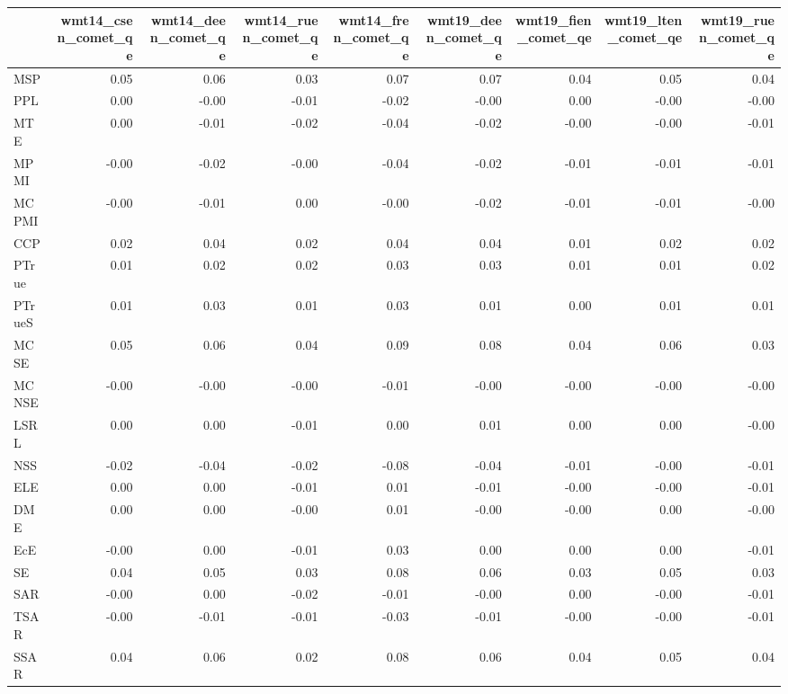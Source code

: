 \begin{tabular}{lrrrrrrrr}
\toprule
 & wmt14\_csen\_comet\_qe & wmt14\_deen\_comet\_qe & wmt14\_ruen\_comet\_qe & wmt14\_fren\_comet\_qe & wmt19\_deen\_comet\_qe & wmt19\_fien\_comet\_qe & wmt19\_lten\_comet\_qe & wmt19\_ruen\_comet\_qe \\
\midrule
MSP & 0.05 & 0.06 & 0.03 & 0.07 & 0.07 & 0.04 & 0.05 & 0.04 \\
PPL & 0.00 & -0.00 & -0.01 & -0.02 & -0.00 & 0.00 & -0.00 & -0.00 \\
MTE & 0.00 & -0.01 & -0.02 & -0.04 & -0.02 & -0.00 & -0.00 & -0.01 \\
MPMI & -0.00 & -0.02 & -0.00 & -0.04 & -0.02 & -0.01 & -0.01 & -0.01 \\
MCPMI & -0.00 & -0.01 & 0.00 & -0.00 & -0.02 & -0.01 & -0.01 & -0.00 \\
CCP & 0.02 & 0.04 & 0.02 & 0.04 & 0.04 & 0.01 & 0.02 & 0.02 \\
PTrue & 0.01 & 0.02 & 0.02 & 0.03 & 0.03 & 0.01 & 0.01 & 0.02 \\
PTrueS & 0.01 & 0.03 & 0.01 & 0.03 & 0.01 & 0.00 & 0.01 & 0.01 \\
MCSE & 0.05 & 0.06 & 0.04 & 0.09 & 0.08 & 0.04 & 0.06 & 0.03 \\
MCNSE & -0.00 & -0.00 & -0.00 & -0.01 & -0.00 & -0.00 & -0.00 & -0.00 \\
LSRL & 0.00 & 0.00 & -0.01 & 0.00 & 0.01 & 0.00 & 0.00 & -0.00 \\
NSS & -0.02 & -0.04 & -0.02 & -0.08 & -0.04 & -0.01 & -0.00 & -0.01 \\
ELE & 0.00 & 0.00 & -0.01 & 0.01 & -0.01 & -0.00 & -0.00 & -0.01 \\
DME & 0.00 & 0.00 & -0.00 & 0.01 & -0.00 & -0.00 & 0.00 & -0.00 \\
EcE & -0.00 & 0.00 & -0.01 & 0.03 & 0.00 & 0.00 & 0.00 & -0.01 \\
SE & 0.04 & 0.05 & 0.03 & 0.08 & 0.06 & 0.03 & 0.05 & 0.03 \\
SAR & -0.00 & 0.00 & -0.02 & -0.01 & -0.00 & 0.00 & -0.00 & -0.01 \\
TSAR & -0.00 & -0.01 & -0.01 & -0.03 & -0.01 & -0.00 & -0.00 & -0.01 \\
SSAR & 0.04 & 0.06 & 0.02 & 0.08 & 0.06 & 0.04 & 0.05 & 0.04 \\
\bottomrule
\end{tabular}
